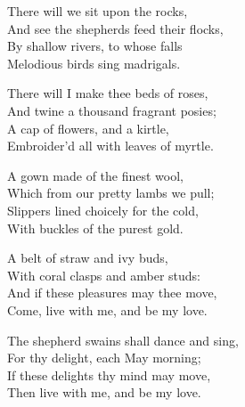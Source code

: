 

\settowidth{\versewidth}{And see the shepherds feed their flocks,}
\begin{dcverse}There will we sit upon the rocks,\\
And see the shepherds feed their flocks,\\
By shallow rivers, to whose falls\\
Melodious birds sing madrigals.

There will I make thee beds of roses,\\
And twine a thousand fragrant posies;\\
A cap of flowers, and a kirtle,\\
Embroider’d all with leaves of myrtle.

A gown made of the finest wool,\\
Which from our pretty lambs we pull;\\
Slippers lined choicely for the cold,\\
With buckles of the purest gold.

A belt of straw and ivy buds,\\
With coral clasps and amber studs:\\
And if these pleasures may thee move,\\
Come, live with me, and be my love.
\end{dcverse}


\begin{scverse}The shepherd swains shall dance and sing,\\
For thy delight, each May morning;\\
If these delights thy mind may move,\\
Then live with me, and be my love.
\end{scverse}

\pagebreak


